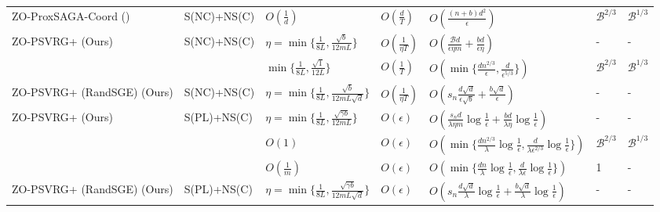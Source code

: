 \documentclass[iicol,sn-basic]{sn-jnl}
\theoremstyle{thmstyleone}%
\theoremstyle{thmstyletwo}%
\theoremstyle{thmstylethree}%
\begin{document}
\begin{table}[htb!]
\begin{adjustbox}{width=1.\linewidth,center}
{\begin{tabular}{ |l|l|l|l|l|l|l| }
   ZO-ProxSAGA-Coord (\cite{huang2019faster}) & S(NC)+NS(C)& $O\left(\frac{1}{{d}}\right)$ & $O\left(\frac{d}{T}\right)$ & $O(\frac{(n + b)d^2}{\epsilon})$ & $\mathcal{B}^{2/3}$ & $\mathcal{B}^{1/3}$ \\
   ZO-PSVRG+ (Ours)  & S(NC)+NS(C) & $\eta = \min\{\frac{1}{8L}, \frac{\sqrt{b}}{12mL}\}$ & $O\left(\frac{1}{\eta T}\right)$ &  $O\left(\frac{\mathcal{B}d}{\epsilon\eta m}+\frac{bd}{\epsilon\eta}\right)$ & - & -\\
   &  & $\min\{\frac{1}{8L}, \frac{\sqrt{1}}{12L}\}$ & $O\left(\frac{1}{T}\right)$ &  $O\left(\min\{\frac{dn^{2/3}}{\epsilon},\frac{d}{\epsilon^{5/3}}\}\right)$ & $\mathcal{B}^{2/3}$ & $\mathcal{B}^{1/3}$ \\
   ZO-PSVRG+ (RandSGE) (Ours)  & S(NC)+NS(C) & $\eta = \min\{\frac{1}{8L}, \frac{\sqrt{b}}{12mL\sqrt{d}}\}$ & $O\left(\frac{1}{\eta T}\right)$ & $O\left(s_n\frac{d\sqrt{d}}{\epsilon \sqrt{b}}+\frac{b\sqrt{d}}{\epsilon}\right)$ & - & -\\
   ZO-PSVRG+ (Ours) & S(PL)+NS(C) & $\eta = \min\{\frac{1}{8L}, \frac{\sqrt{\gamma b}}{12 m L }\}$ & $O\left(\epsilon\right)$ & {$O(\frac{s_n d}{\lambda\eta m}\log\frac{1}{\epsilon}+\frac{b d}{\lambda\eta}\log\frac{1}{\epsilon})$} & - & - \\
   &  & $O(1)$ & $O\left(\epsilon\right)$ & $O(\min\{\frac{dn^{2/3}}{\lambda}\log\frac{1}{\epsilon},\frac{d}{\lambda\epsilon^{2/3}}\log\frac{1}{\epsilon}\})$ & $\mathcal{B}^{2/3}$ & $\mathcal{B}^{1/3}$ \\
   &  & $O(\frac{1}{m})$ & $O\left(\epsilon\right)$ & {$O(\min\{\frac{dn}{\lambda}\log\frac{1}{\epsilon},\frac{d}{\lambda\epsilon}\log\frac{1}{\epsilon}\})$} & 1 & - \\
   ZO-PSVRG+ (RandSGE) (Ours) & S(PL)+NS(C) & $\eta = \min\{\frac{1}{8L}, \frac{\sqrt{\gamma b}}{12 m L \sqrt{d}}\}$& $O\left({\epsilon}\right)$ & {$O(s_n\frac{d\sqrt{d}}{\lambda}\log\frac{1}{\epsilon}+\frac{b\sqrt{d}}{\lambda}\log\frac{1}{\epsilon})$} & - & -\\
 \bottomrule
\end{tabular}
}\end{adjustbox}
\end{table}
\end{document}
